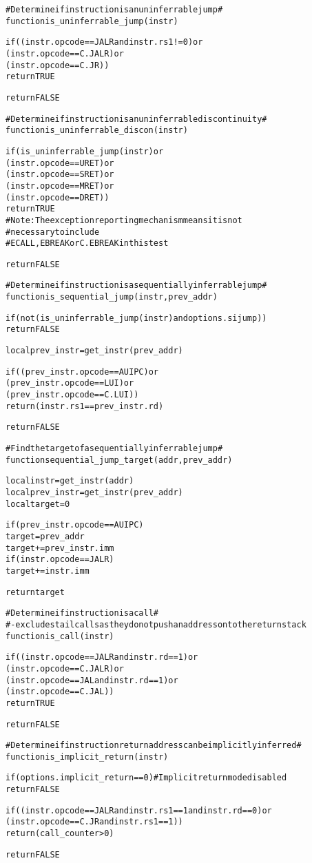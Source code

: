 \pagebreak

\begin{alltt}
# Determine if instruction is an uninferrable jump #
function is_uninferrable_jump (instr)

  if ((instr.opcode == JALR and instr.rs1 != 0) or
      (instr.opcode == C.JALR)                  or
      (instr.opcode == C.JR))
    return TRUE

  return FALSE

# Determine if instruction is an uninferrable discontinuity #
function is_uninferrable_discon (instr)

  if (is_uninferrable_jump(instr) or
      (instr.opcode == URET)      or
      (instr.opcode == SRET)      or
      (instr.opcode == MRET)      or
      (instr.opcode == DRET))
    return TRUE
    # Note: The exception reporting mechanism means it is not
    #   necessary to include
    # ECALL, EBREAK or C.EBREAK in this test

  return FALSE

# Determine if instruction is a sequentially inferrable jump #
function is_sequential_jump (instr, prev_addr)

  if (not (is_uninferrable_jump(instr) and options.sijump))
    return FALSE

  local prev_instr = get_instr(prev_addr)

  if((prev_instr.opcode == AUIPC) or
     (prev_instr.opcode == LUI)   or
     (prev_instr.opcode == C.LUI))
    return (instr.rs1 == prev_instr.rd)

  return FALSE
\end{alltt}

\pagebreak

\begin{alltt}
# Find the target of a sequentially inferrable jump #
function sequential_jump_target (addr, prev_addr)

  local instr      = get_instr(addr)
  local prev_instr = get_instr(prev_addr)
  local target     = 0

  if (prev_instr.opcode == AUIPC)
    target = prev_addr
  target += prev_instr.imm
  if (instr.opcode == JALR)
    target += instr.imm

  return target

# Determine if instruction is a call #
# - excludes tail calls as they do not push an address onto the return stack
function is_call (instr)

  if ((instr.opcode == JALR and instr.rd == 1) or
      (instr.opcode == C.JALR)                 or
      (instr.opcode == JAL  and instr.rd == 1) or
      (instr.opcode == C.JAL))
    return TRUE

  return FALSE

# Determine if instruction return address can be implicitly inferred #
function is_implicit_return (instr)

  if (options.implicit_return == 0) # Implicit return mode disabled
    return FALSE

  if ((instr.opcode == JALR and instr.rs1 == 1 and instr.rd == 0) or
      (instr.opcode == C.JR and instr.rs1 == 1))
    return (call_counter > 0)

  return FALSE
\end{alltt}

